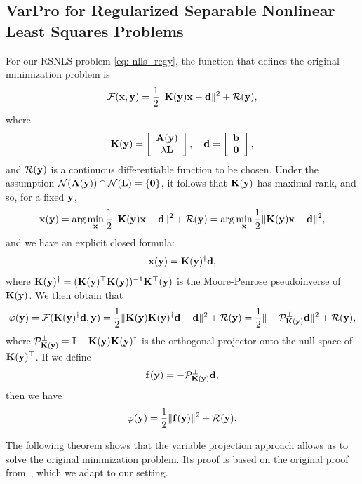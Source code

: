 \documentclass[onefignum,onetabnum]{siamart171218}
\newcommand{\bA}{{\bf A}}
\newcommand{\bK}{{\bf K}}
\newcommand{\bL}{{\bf L}}
\newcommand{\bb}{{\bf b}}
\newcommand{\bd}{{\bf d}}
\newcommand{\bff}{{\bf f}}
\newcommand{\bx}{{\bf x}}
\newcommand{\by}{{\bf y}}
\newcommand{\calF}{\mathcal{F}}
\newcommand{\calN}{\mathcal{N}}
\newcommand{\calP}{\mathcal{P}}
\begin{document}
\subsection{VarPro for Regularized Separable Nonlinear Least Squares Problems}
For our RSNLS problem \eqref{eq: nlls_regy}, the function that defines the original minimization problem is
\begin{equation}\label{eq: def_calF}
\calF(\bx, \by)= \frac{1}{2}\| \bK(\by) \bx - \bd \|^2 + \mathcal{R}(\by),
\end{equation}
where
\begin{equation}\label{eq: defKd}
\bK(\by)=\left[\begin{array}{c} \bA(\by) \\ \lambda \bL\end{array}\right], \quad \bd=\left[\begin{array}{c} \bb \\ \boldsymbol{0} \end{array}\right], \end{equation}
and $\mathcal{R}(\by)$ is a continuous differentiable function to be chosen.
Under the assumption $\calN(\bA(\by))\cap \calN(\bL) = \{\boldsymbol{0}\}$, it follows that $\bK(\by)$ has maximal rank, and so, for a fixed $\by$,
\[\bx(\by)=\arg\min_{\bx}  \frac{1}{2}\| \bK(\by) \bx - \bd \|^2 + \mathcal{R}(\by) = \arg\min_{\bx}  \frac{1}{2}\| \bK(\by) \bx - \bd \|^2,\] 
and we have an explicit closed formula:
\[ \bx(\by) = \bK(\by)^{\dagger} \bd,\]
where $\bK(\by)^{\dagger}= (\bK(\by)^\top\bK(\by))^{-1}\bK^\top(\by)$ is the Moore-Penrose pseudoinverse of $\bK(\by)$.
We then obtain that
\[ \varphi(\by) =  \calF(\bK(\by)^{\dagger} \bd, \by) = \frac{1}{2}\| \bK(\by) \bK(\by)^{\dagger} \bd - \bd \|^2  + \mathcal{R}(\by) =  \frac{1}{2}\|  -\calP_{\bK(\by)}^\perp \bd \|^2 + \mathcal{R}(\by),\]
where $\mathcal{P}_{\bK(\by)}^\perp = \mathbf{I} - \bK(\by)\bK(\by)^\dagger$ is the orthogonal projector onto the null space of $\bK(\by)^\top$. If we define $$\bff(\by)=  -\calP_{\bK(\by)}^\perp \bd,$$ then we have
\begin{equation}\label{eq: def_varphi}
 \varphi(\by) = \dfrac{1}{2}\| \bff(\by) \|^2 + \mathcal{R}(\by). 
\end{equation}

The following theorem shows that the variable projection approach allows us to solve the original minimization problem. Its proof is based on the original proof from~\cite{golub1973differentiation}, which we adapt to our setting.
\end{document}
